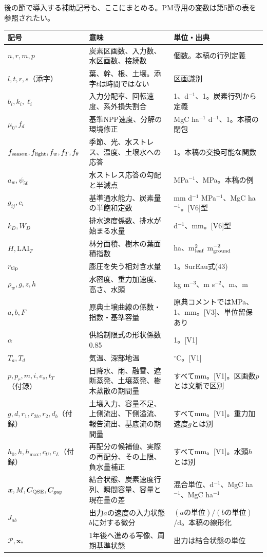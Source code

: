 \documentclass[a4paper,11pt]{ltjsarticle}
\begin{document}
後の節で導入する補助記号も、ここにまとめる。PM専用の変数は第5節の表を参照されたい。
\begin{longtable}{p{.23\linewidth}p{.45\linewidth}p{.26\linewidth}}
\toprule 記号 & 意味 & 単位・出典\\\midrule\endhead
$n,r,m,p$ & 炭素区画数、入力数、水区画数、接続数 & 個数。本稿の行列定義\\
$l,t,r,s$（添字） & 葉、幹、根、土壌。添字$t$は時間ではない & 区画識別\\
$b_i,k_i,\ell_i$ & 入力分配率、回転速度、系外損失割合 & 1、d$^{-1}$、1。炭素行列から定義\\
$\mu_0,f_d$ & 基準NPP速度、分解の環境修正 & MgC ha$^{-1}$ d$^{-1}$、1。本稿の閉包\\
$f_{\rm season},f_{\rm light},f_w,f_T,f_\theta$ & 季節、光、水ストレス、温度、土壌水への応答 & 1。本稿の交換可能な関数\\
$a_w,\psi_{50}$ & 水ストレス応答の勾配と半減点 & MPa$^{-1}$、MPa。本稿の例\\
$g_{ij},c_i$ & 基準通水能力、炭素量の半飽和定数 & mm d$^{-1}$ MPa$^{-1}$、MgC ha$^{-1}$。[V6]型\\
$k_D,W_D$ & 排水速度係数、排水が始まる水量 & d$^{-1}$、mm。[V6]型\\
$H,\mathrm{LAI}_T$ & 林分面積、樹木の葉面積指数 & ha、m$^2_{\rm leaf}$ m$^{-2}_{\rm ground}$\\
$r_{\rm tlp}$ & 膨圧を失う相対含水量 & 1。SurEau式(43)\\
$\rho_w,g,z,h$ & 水密度、重力加速度、高さ、水頭 & kg m$^{-3}$、m s$^{-2}$、m、m\\
$a,b,F$ & 原典土壌曲線の係数・指数・基準容量 & 原典コメントではMPa、1、mm。[V3]、単位留保あり\\
$\alpha$ & 供給制限式の形状係数0.85 & 1。[V1]\\
$T_a,T_d$ & 気温、深部地温 & $^\circ$C。[V1]\\
$p,p_r,m,i,e_s,t_T$（付録） & 日降水、雨、融雪、遮断蒸発、土壌蒸発、樹木蒸散の期間量 & すべてmm。[V1]。区画数$p$とは文脈で区別\\
$g,d,r_1,r_{2b},r_2,d_b$（付録） & 土壌入力、容量不足、上側流出、下側溢流、報告流出、基底流の期間量 & すべてmm。[V1]。重力加速度$g$とは別\\
$h_0,h,h_{\max},c_U,c_L$（付録） & 再配分の候補値、実際の再配分、その上限、負水量補正 & すべてmm。[V1]。水頭$h$とは別\\
$\bm x,M,\bm C_{\rm QSE},\bm C_{\rm gap}$ & 結合状態、炭素速度行列、瞬間容量、容量と現在量の差 & 混合単位、d$^{-1}$、MgC ha$^{-1}$、MgC ha$^{-1}$\\
$J_{ab}$ & 出力$a$の速度の入力状態$b$に対する微分 & $(a\text{の単位})/(b\text{の単位})$/d。本稿の線形化\\
$\mathcal P,\bm x_*$ & 1年後へ進める写像、周期基準状態 & 出力は結合状態の単位\\
\bottomrule
\end{longtable}
\end{document}
